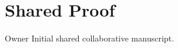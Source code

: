 \documentclass{article}
\begin{document}
\section{Shared Proof}
Owner Initial shared collaborative manuscript.
\end{document}

